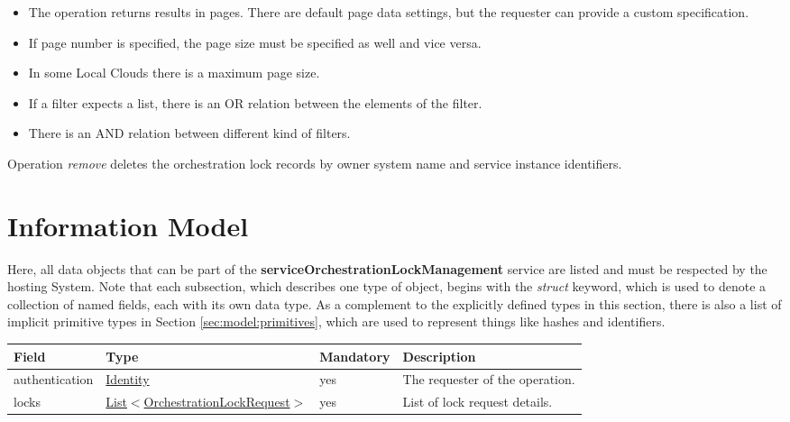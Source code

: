 \documentclass[a4paper]{arrowhead}
\newcommand{\pref}[1]{{\textcolor{ArrowheadGrey}{\hyperref[sec:model:primitives:#1]{#1}}}}
\begin{document}
\begin{itemize}
    \item The operation returns results in pages. There are default page data settings, but the requester can provide a custom specification.
    \item If page number is specified, the page size must be specified as well and vice versa.
    \item In some Local Clouds there is a maximum page size.
    \item If a filter expects a list, there is an OR relation between the elements of the filter.
    \item There is an AND relation between different kind of filters.
\end{itemize}


Operation \textit{remove} deletes the orchestration lock records by owner system name and service instance identifiers.

\clearpage

\section{Information Model}
\label{sec:model}

Here, all data objects that can be part of the \textbf{serviceOrchestrationLockManagement} service are listed and must be respected by the hosting System.
Note that each subsection, which describes one type of object, begins with the \textit{struct} keyword, which is used to denote a collection of named fields, each with its own data type.
As a complement to the explicitly defined types in this section, there is also a list of implicit primitive types in Section \ref{sec:model:primitives}, which are used to represent things like hashes and identifiers.



\begin{table}[ht!]
\begin{tabularx}{\textwidth}{| p{2.5cm} | p{6.3cm} | p{2cm} | X |} \hline
\rowcolor{gray!33} Field & Type & Mandatory & Description \\ \hline
authentication & \hyperref[sec:model:Identity]{Identity} & yes & The requester of the operation. \\ \hline
locks &  \pref{List}$<$\hyperref[sec:model:OrchestrationLockRequest]{OrchestrationLockRequest}$>$ & yes & List of lock request details. \\ \hline
\end{tabularx}
\end{table}
\end{document}
